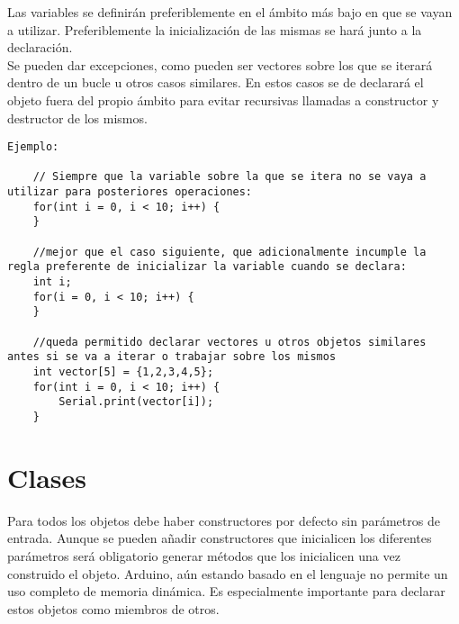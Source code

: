 
    Las variables se definirán preferiblemente en el ámbito más bajo  en que se vayan a utilizar. Preferiblemente la inicialización de las mismas se hará junto a la declaración.
    \\ 
    
    Se pueden dar excepciones, como pueden ser vectores sobre los que se iterará dentro de un bucle u otros casos similares. En estos casos se de declarará el objeto fuera del propio ámbito para evitar recursivas llamadas a constructor y destructor de los mismos.
    \\ 
    
    \lstset{language=C, breaklines=true, basicstyle=\footnotesize}
    \begin{lstlisting}[frame=single]
Ejemplo: 
    
    // Siempre que la variable sobre la que se itera no se vaya a utilizar para posteriores operaciones: 
    for(int i = 0, i < 10; i++) {
    }
    
    //mejor que el caso siguiente, que adicionalmente incumple la regla preferente de inicializar la variable cuando se declara:
    int i; 
    for(i = 0, i < 10; i++) {
    }
    
    //queda permitido declarar vectores u otros objetos similares antes si se va a iterar o trabajar sobre los mismos
    int vector[5] = {1,2,3,4,5};
    for(int i = 0, i < 10; i++) {
        Serial.print(vector[i]);
    }

    \end{lstlisting}
    
\section{Clases}\label{sec:codificacionSW:clases}


Para todos los objetos debe haber constructores por defecto sin parámetros de entrada. Aunque se pueden añadir constructores que inicialicen los diferentes parámetros será obligatorio generar métodos que los inicialicen una vez construido el objeto. Arduino, aún estando basado en el lenguaje  no permite un uso completo de memoria dinámica. Es especialmente importante para declarar estos objetos como miembros de otros. 
\\ 

